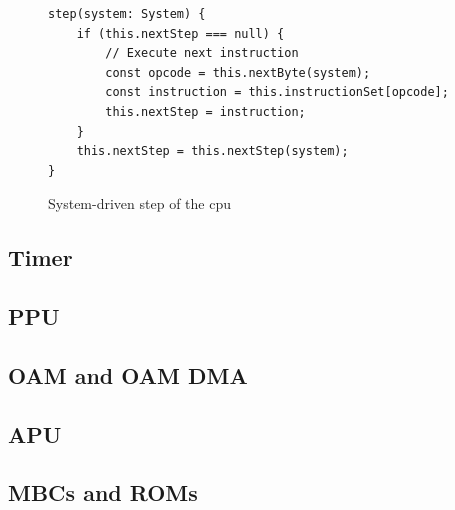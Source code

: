\documentclass[11pt]{report}
\begin{document}
\begin{figure}[h]
    \begin{verbatim}
step(system: System) {
    if (this.nextStep === null) {
        // Execute next instruction
        const opcode = this.nextByte(system);
        const instruction = this.instructionSet[opcode];
        this.nextStep = instruction;
    }
    this.nextStep = this.nextStep(system);
}
    \end{verbatim}
    \caption{System-driven step of the \gls{cpu}}
    \label{fig:system-driven-cpu-tick}
\end{figure}

\subsection{Timer}
\subsection{PPU}
\subsection{OAM and OAM DMA}
\subsection{APU}
\subsection{MBCs and ROMs}

\clearpage

\printnoidxglossary[type=\acronymtype]
\printnoidxglossary[type=main]

\printbibliography
\end{document}
